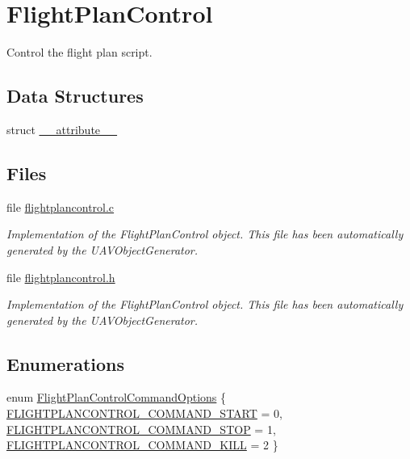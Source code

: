 \hypertarget{group___flight_plan_control}{\section{\-Flight\-Plan\-Control}
\label{group___flight_plan_control}
}


\-Control the flight plan script.  


\subsection*{\-Data \-Structures}
\begin{DoxyCompactItemize}
\item 
struct \hyperlink{struct____attribute____}{\-\_\-\-\_\-attribute\-\_\-\-\_\-}
\end{DoxyCompactItemize}
\subsection*{\-Files}
\begin{DoxyCompactItemize}
\item 
file \hyperlink{flightplancontrol_8c}{flightplancontrol.\-c}
\begin{DoxyCompactList}\small\item\em \-Implementation of the \-Flight\-Plan\-Control object. \-This file has been automatically generated by the \-U\-A\-V\-Object\-Generator. \end{DoxyCompactList}\item 
file \hyperlink{flightplancontrol_8h}{flightplancontrol.\-h}
\begin{DoxyCompactList}\small\item\em \-Implementation of the \-Flight\-Plan\-Control object. \-This file has been automatically generated by the \-U\-A\-V\-Object\-Generator. \end{DoxyCompactList}\end{DoxyCompactItemize}
\subsection*{\-Enumerations}
\begin{DoxyCompactItemize}
\item 
enum \hyperlink{group___flight_plan_control_gae317f66e58a22c9cb7cf373289e48b02}{\-Flight\-Plan\-Control\-Command\-Options} \{ \hyperlink{group___flight_plan_control_ggae317f66e58a22c9cb7cf373289e48b02ac3d16cb5ff7a2ba6287c5691ce2f269e}{\-F\-L\-I\-G\-H\-T\-P\-L\-A\-N\-C\-O\-N\-T\-R\-O\-L\-\_\-\-C\-O\-M\-M\-A\-N\-D\-\_\-\-S\-T\-A\-R\-T} = 0, 
\hyperlink{group___flight_plan_control_ggae317f66e58a22c9cb7cf373289e48b02a942d25b744d54946d9e9a02c42b321cd}{\-F\-L\-I\-G\-H\-T\-P\-L\-A\-N\-C\-O\-N\-T\-R\-O\-L\-\_\-\-C\-O\-M\-M\-A\-N\-D\-\_\-\-S\-T\-O\-P} = 1, 
\hyperlink{group___flight_plan_control_ggae317f66e58a22c9cb7cf373289e48b02ad3c95bd03598c57eabe5c7cd64744e06}{\-F\-L\-I\-G\-H\-T\-P\-L\-A\-N\-C\-O\-N\-T\-R\-O\-L\-\_\-\-C\-O\-M\-M\-A\-N\-D\-\_\-\-K\-I\-L\-L} = 2
 \}
\end{DoxyCompactItemize}

